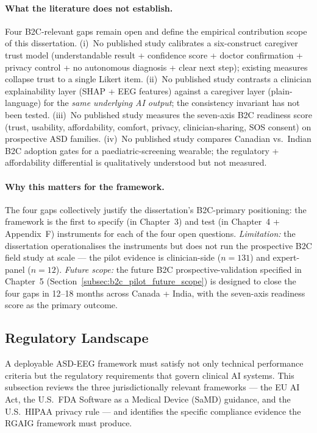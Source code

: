 \paragraph{What the literature does not establish.}
Four B2C-relevant gaps remain open and define the empirical contribution scope of this dissertation. (i)~No published study calibrates a six-construct caregiver trust model (understandable result + confidence score + doctor confirmation + privacy control + no autonomous diagnosis + clear next step); existing measures collapse trust to a single Likert item. (ii)~No published study contrasts a clinician explainability layer (SHAP + EEG features) against a caregiver layer (plain-language) for the \emph{same underlying AI output}; the consistency invariant has not been tested. (iii)~No published study measures the seven-axis B2C readiness score (trust, usability, affordability, comfort, privacy, clinician-sharing, SOS consent) on prospective ASD families. (iv)~No published study compares Canadian vs.\ Indian B2C adoption gates for a paediatric-screening wearable; the regulatory + affordability differential is qualitatively understood but not measured.

\paragraph{Why this matters for the framework.}
The four gaps collectively justify the dissertation's B2C-primary positioning: the framework is the first to specify (in Chapter~3) and test (in Chapter~4 + Appendix~F) instruments for each of the four open questions. \emph{Limitation:} the dissertation operationalises the instruments but does not run the prospective B2C field study at scale --- the pilot evidence is clinician-side ($n = 131$) and expert-panel ($n = 12$). \emph{Future scope:} the future B2C prospective-validation specified in Chapter~5 (Section~\ref{subsec:b2c_pilot_future_scope}) is designed to close the four gaps in 12--18 months across Canada + India, with the seven-axis readiness score as the primary outcome.

\subsection{Regulatory Landscape}
\label{subsec:regulatory_landscape}

A deployable ASD-EEG framework must satisfy not only technical performance criteria but the regulatory requirements that govern clinical AI systems. This subsection reviews the three jurisdictionally relevant frameworks --- the EU AI Act, the U.S.\ FDA Software as a Medical Device (SaMD) guidance, and the U.S.\ HIPAA privacy rule --- and identifies the specific compliance evidence the RGAIG framework must produce.

